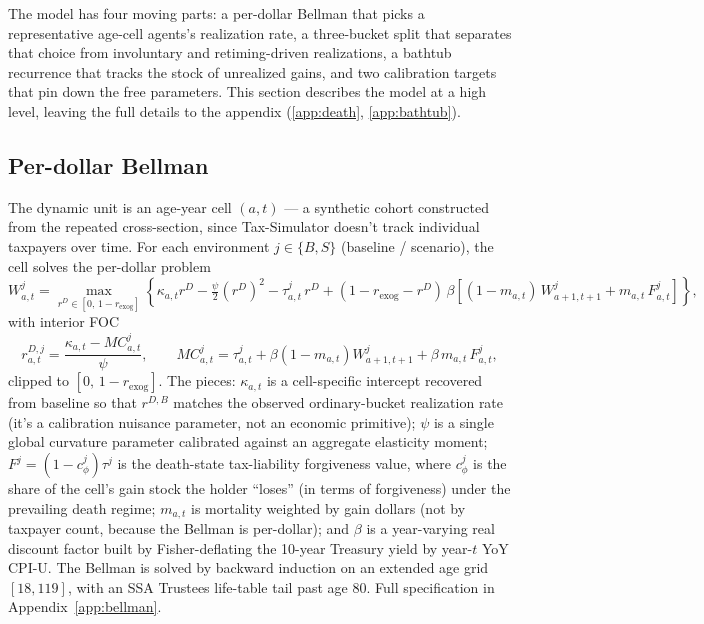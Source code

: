 \documentclass[11pt]{article}
\begin{document}
The model has four moving parts: a per-dollar Bellman that picks a representative age-cell agents's
realization rate, a three-bucket split that separates that choice from
involuntary and retiming-driven realizations, a bathtub recurrence that tracks the
stock of unrealized gains, and two calibration targets that pin down the
free parameters. This section describes the model at a high level, leaving the full details to the appendix
(\ref{app:death}, \ref{app:bathtub}).

\subsection{Per-dollar Bellman}

The dynamic unit is an age-year cell $(a, t)$ --- a synthetic cohort
constructed from the repeated cross-section, since Tax-Simulator doesn't
track individual taxpayers over time. For each environment $j \in \{B, S\}$
(baseline / scenario), the cell solves the per-dollar problem
\begin{equation}
W^j_{a,t}
  = \max_{r^D \in [0,\, 1-r_{\text{exog}}]}
    \!\left\{
      \kappa_{a,t} r^D - \tfrac{\psi}{2}(r^D)^2
      - \tau^j_{a,t}\,r^D
      + (1 - r_{\text{exog}} - r^D)\,\beta\!
        \left[(1 - m_{a,t})\,W^j_{a+1, t+1}
              + m_{a,t}\,F^j_{a,t}\right]
    \right\},
\label{eq:bellman}
\end{equation}
with interior FOC
\begin{equation}
r^{D,j}_{a,t} = \frac{\kappa_{a,t} - MC^j_{a,t}}{\psi},
\qquad
MC^j_{a,t} = \tau^j_{a,t} + \beta(1-m_{a,t})W^j_{a+1,t+1}
             + \beta\,m_{a,t}\,F^j_{a,t},
\label{eq:foc}
\end{equation}
clipped to $[0,\, 1-r_{\text{exog}}]$. The pieces:
$\kappa_{a,t}$ is a cell-specific intercept recovered from baseline so
that $r^{D,B}$ matches the observed ordinary-bucket realization rate
(it's a calibration nuisance parameter, not an economic primitive);
$\psi$ is a single global curvature parameter calibrated against an
aggregate elasticity moment; $F^j = (1 - c_\phi^j)\tau^j$ is the
death-state tax-liability forgiveness value, where $c_\phi^j$ is the
share of the cell's gain stock the holder ``loses'' (in terms of
forgiveness) under the prevailing death regime; $m_{a,t}$ is mortality
weighted by gain dollars (not by taxpayer count, because the Bellman is
per-dollar); and $\beta$ is a year-varying real discount factor built by
Fisher-deflating the 10-year Treasury yield by year-$t$ YoY CPI-U. The
Bellman is solved by backward induction on an extended age grid $[18,
119]$, with an SSA Trustees life-table tail past age 80. Full
specification in Appendix~\ref{app:bellman}.
\end{document}
